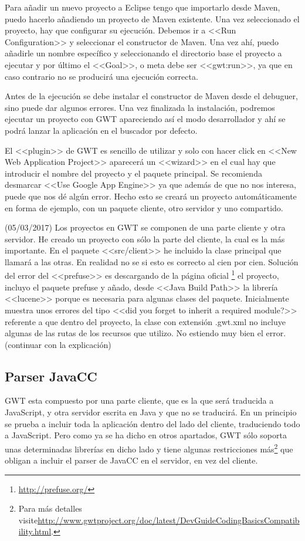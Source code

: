 Para añadir un nuevo proyecto a Eclipse tengo que importarlo desde Maven, puedo hacerlo añadiendo un proyecto de Maven existente. Una vez seleccionado el proyecto, hay que configurar su ejecución. Debemos ir a <<Run Configuration>> y seleccionar el constructor de Maven. Una vez ahí, puedo añadirle un nombre específico y seleccionando el directorio base el proyecto a ejecutar y por último el <<Goal>>, o meta debe ser <<gwt:run>>, ya que en caso contrario no se producirá una ejecución correcta.

Antes de la ejecución se debe instalar el constructor de Maven desde el debuguer, sino puede dar algunos errores. Una vez finalizada la instalación, podremos ejecutar un proyecto con GWT apareciendo así el modo desarrollador y ahí se podrá lanzar la aplicación en el buscador por defecto.

El <<plugin>> de GWT es sencillo de utilizar y solo con hacer click en <<New Web Application Project>> aparecerá un <<wizard>> en el cual hay que introducir el nombre del proyecto y el paquete principal. Se recomienda desmarcar <<Use Google App Engine>> ya que además de que no nos interesa, puede que nos dé algún error. Hecho esto se creará un proyecto automáticamente en forma de ejemplo, con un paquete cliente, otro servidor y uno compartido.


(05/03/2017)
Los proyectos en GWT se componen de una parte cliente y otra servidor. He creado un proyecto con sólo la parte del cliente, la cual es la más importante. En el paquete <<src/client>> he incluido la clase principal que llamará a las otras. En realidad no se si esto es correcto al cien por cien.
Solución del error del  <<prefuse>> es descargando de la página oficial \footnote{\url{http://prefuse.org/}} el proyecto, incluyo el paquete prefuse y añado, desde <<Java Build Path>> la librería  <<lucene>> porque es necesaria para algunas clases del paquete. Inicialmente muestra unos errores del tipo <<did you forget to inherit a required module?>> referente a que dentro del proyecto, la clase con extensión .gwt.xml no incluye algunas de las rutas de los recursos que utilizo. No estiendo muy bien el error. (continuar con la explicación)


 
\subsection{Parser JavaCC}

GWT esta compuesto por una parte cliente, que es la que será traducida a JavaScript, y otra servidor escrita en Java y que no se traducirá. En un principio se prueba a incluir toda la aplicación dentro del lado del cliente, traduciendo todo a JavaScript. Pero como ya se ha dicho en otros apartados, GWT sólo soporta unas determinadas librerías en dicho lado y tiene algunas restricciones más\footnote{Para más detalles visite\url{http://www.gwtproject.org/doc/latest/DevGuideCodingBasicsCompatibility.html}.} que obligan a incluir el parser de JavaCC en el servidor, en vez del cliente.

